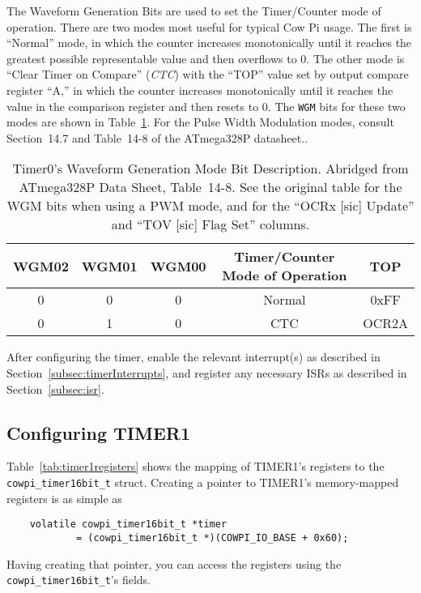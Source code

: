 The Waveform Generation Bits are used to set the Timer/Counter mode of operation.
There are two modes most useful for typical Cow Pi usage.
The first is ``Normal'' mode, in which the counter increases monotonically until it reaches the greatest possible representable value and then overflows to 0.
The other mode is ``Clear Timer on Compare'' (\textit{CTC}) with the ``TOP'' value set by output compare register ``A,'' in which the counter increases monotonically until it reaches the value in the comparison register and then resets to 0.
The \texttt{WGM} bits for these two modes are shown in Table~\ref{tab:timer0wgm}.
For the Pulse Width Modulation modes, consult Section~14.7 and Table~14\mbox{-}8 of the ATmega328P datasheet.\cite{ATmega328P}.

\begin{table}[h]
    \centering \small
    \begin{tabular}{|c|c|c|c|c|} \hline
    \textbf{WGM02}    & \textbf{WGM01}    & \textbf{WGM00}    & \textbf{Timer/Counter Mode of Operation}  & TOP    \\ \hline\hline
    0                 & 0                 & 0                 & Normal                                    & 0xFF   \\ \hline
    0                 & 1                 & 0                 & CTC                                       & OCR2A  \\ \hline
    \end{tabular}
    \caption{Timer0's Waveform Generation Mode Bit Description. \tiny Abridged from ATmega328P Data Sheet, Table~14\mbox{-}8.\cite{ATmega328P} See the original table for the WGM bits when using a PWM mode, and for the ``OCRx [sic] Update'' and ``TOV [sic] Flag Set'' columns. \label{tab:timer0wgm}}
\end{table}

After configuring the timer, enable the relevant interrupt(s) as described in Section~\ref{subsec:timerInterrupts}, and register any necessary ISRs as described in Section~\ref{subsec:isr}.


\subsection{Configuring TIMER1}

Table~\ref{tab:timer1registers} shows the mapping of TIMER1's registers to the \lstinline{cowpi_timer16bit_t} struct.
Creating a pointer to TIMER1's memory-mapped registers is as simple as
\begin{lstlisting}
    volatile cowpi_timer16bit_t *timer
            = (cowpi_timer16bit_t *)(COWPI_IO_BASE + 0x60);
\end{lstlisting}
Having creating that pointer, you can access the registers using the \lstinline{cowpi_timer16bit_t}'s fields.


